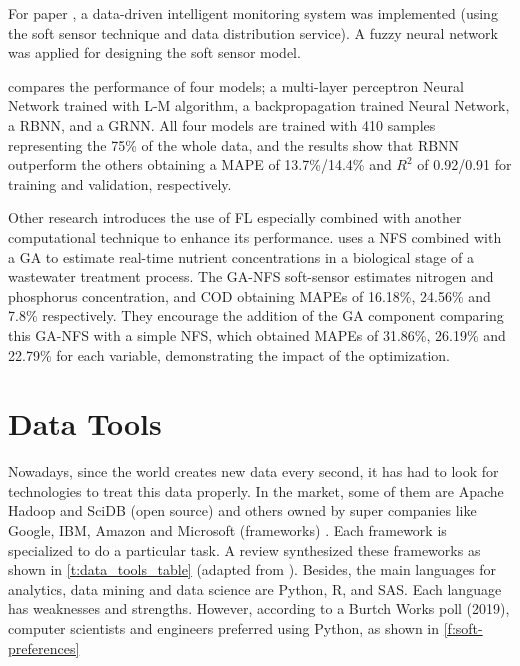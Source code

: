 For paper \cite{Han2018}, a data-driven intelligent monitoring system was implemented (using the soft sensor technique and data distribution service). A fuzzy neural network was applied for designing the soft sensor model.

\cite{Shen2018} compares the performance of four models; a multi-layer perceptron Neural Network trained with \ac{L-M} algorithm, a backpropagation trained Neural Network, a \ac{RBNN}, and a \ac{GRNN}. All four models are trained with 410 samples representing the 75\% of the whole data, and the results show that \ac{RBNN} outperform the others obtaining a \ac{MAPE} of 13.7\%/14.4\% and \begin{math}R^2\end{math} of 0.92/0.91 for training and validation, respectively.

Other research introduces the use of \ac{FL} especially combined with another computational technique to enhance its performance. \cite{Huang2015} uses a \ac{NFS} combined with a \ac{GA} to estimate real-time nutrient concentrations in a biological stage of a wastewater treatment process. The GA-NFS soft-sensor estimates nitrogen and phosphorus concentration, and \ac{COD} obtaining \ac{MAPE}s of 16.18\%, 24.56\% and 7.8\% respectively. They encourage the addition of the GA component comparing this \ac{GA}-\ac{NFS} with a simple \ac{NFS}, which obtained \ac{MAPE}s of 31.86\%, 26.19\% and 22.79\% for each variable, demonstrating the impact of the optimization.

\section{Data Tools}
\label{s:Related-Works-Data-Tools}

Nowadays, since the world creates new data every second, it has had to look for technologies to treat this data properly. In the market, some of them are Apache Hadoop and SciDB (open source) and others owned by super companies like Google, IBM, Amazon and Microsoft (frameworks) \cite{Siddiqui2015}. Each framework is specialized to do a particular task. A review \cite{Valentin-Vargas2012} synthesized these frameworks as shown in \autoref{t:data_tools_table} (adapted from \cite{Valentin-Vargas2012}). Besides, the main languages for analytics, data mining and data science are Python, R, and SAS. Each language has weaknesses and strengths. However, according to a Burtch Works poll (2019), computer scientists and engineers preferred using Python, as shown in \autoref{f:soft-preferences}

